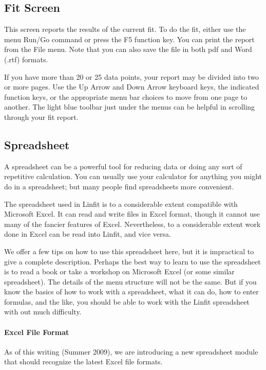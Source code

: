 \subsection*{Fit Screen}

This screen reports the results of the current fit.  To do the fit,
either use the menu Run/Go command or press the F5 function key.  You
can print the report from the File menu.  Note that you can also save the file in both pdf and Word (.rtf) formats.

If you have more than 20 or 25 data points, your report may be
divided into two or more pages.  Use the Up Arrow and Down Arrow
keyboard keys, the indicated function keys, or the appropriate menu
bar choices to move from one page to another.  The light blue toolbar just under the menus can be helpful in scrolling through your fit report.

\subsection*{Spreadsheet}

A spreadsheet can be a powerful tool for reducing data or doing any
sort of repetitive calculation.  You can usually use your calculator
for anything you might do in a spreadsheet; but many people find
spreadsheets more convenient.

The spreadsheet used in Linfit is to a considerable extent compatible
with Microsoft Excel.  It can read and write files in Excel format,
though it cannot use many of the
fancier features of Excel.  Nevertheless, to a considerable extent
work done in Excel can be read into Linfit, and vice versa.

We offer a few tips on how to use this spreadsheet here, but it is
impractical to give a complete description.  Perhaps the best way to
learn to use the spreadsheet is to read a book or take a workshop on
Microsoft Excel (or some similar spreadsheet).  The details of the
menu structure will not be the same.  But if you know the basics of
how to work with a spreadsheet, what it can do, how to enter formulas,
and the like, you should be able to work with the Linfit
spreadsheet with out much difficulty.

\paragraph*{Excel File Format} As of this writing (Summer 2009), we are introducing
a new spreadsheet module that should recognize the latest Excel file formats.

